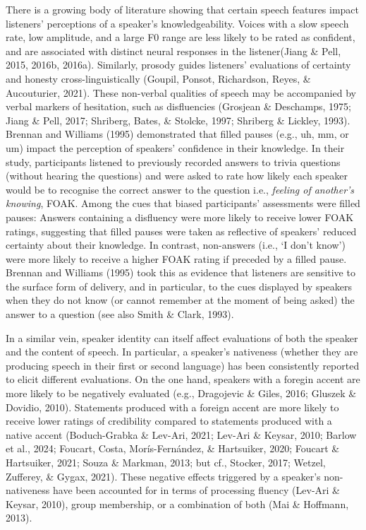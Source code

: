 \documentclass[
  man,floatsintext]{apa7}
\begin{document}
There is a growing body of literature showing that certain speech features impact listeners' perceptions of a speaker's knowledgeability. Voices with a slow speech rate, low amplitude, and a large F0 range are less likely to be rated as confident, and are associated with distinct neural responses in the listener(Jiang \& Pell, 2015, 2016b, 2016a). Similarly, prosody guides listeners' evaluations of certainty and honesty cross-linguistically (Goupil, Ponsot, Richardson, Reyes, \& Aucouturier, 2021). These non-verbal qualities of speech may be accompanied by verbal markers of hesitation, such as disfluencies (Grosjean \& Deschamps, 1975; Jiang \& Pell, 2017; Shriberg, Bates, \& Stolcke, 1997; Shriberg \& Lickley, 1993). Brennan and Williams (1995) demonstrated that filled pauses (e.g., uh, mm, or um) impact the perception of speakers' confidence in their knowledge. In their study, participants listened to previously recorded answers to trivia questions (without hearing the questions) and were asked to rate how likely each speaker would be to recognise the correct answer to the question i.e., \emph{feeling of another's knowing}, FOAK. Among the cues that biased participants' assessments were filled pauses: Answers containing a disfluency were more likely to receive lower FOAK ratings, suggesting that filled pauses were taken as reflective of speakers' reduced certainty about their knowledge. In contrast, non-answers (i.e., `I don't know') were more likely to receive a higher FOAK rating if preceded by a filled pause. Brennan and Williams (1995) took this as evidence that listeners are sensitive to the surface form of delivery, and in particular, to the cues displayed by speakers when they do not know (or cannot remember at the moment of being asked) the answer to a question (see also Smith \& Clark, 1993).

In a similar vein, speaker identity can itself affect evaluations of both the speaker and the content of speech. In particular, a speaker's nativeness (whether they are producing speech in their first or second language) has been consistently reported to elicit different evaluations. On the one hand, speakers with a foregin accent are more likely to be negatively evaluated (e.g., Dragojevic \& Giles, 2016; Gluszek \& Dovidio, 2010). Statements produced with a foreign accent are more likely to receive lower ratings of credibility compared to statements produced with a native accent (Boduch-Grabka \& Lev-Ari, 2021; Lev-Ari \& Keysar, 2010; Barlow et al., 2024; Foucart, Costa, Morís-Fernández, \& Hartsuiker, 2020; Foucart \& Hartsuiker, 2021; Souza \& Markman, 2013; but cf., Stocker, 2017; Wetzel, Zufferey, \& Gygax, 2021). These negative effects triggered by a speaker's non-nativeness have been accounted for in terms of processing fluency (Lev-Ari \& Keysar, 2010), group membership, or a combination of both (Mai \& Hoffmann, 2013).
\end{document}
